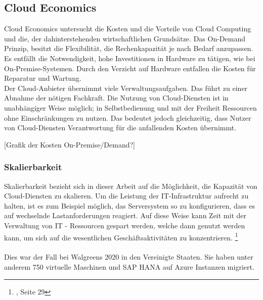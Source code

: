 \subsection{Cloud Economics}\label{subsec_UabsGrund3}
\begin{flushleft}
      Cloud Economics untersucht die Kosten und die Vorteile von Cloud Computing und die, der dahinterstehenden wirtschaftlichen Grundsätze. Das On-Demand Prinzip, besitzt die Flexibilität, die Rechenkapazität je nach Bedarf anzupassen.
      Es entfällt die Notwendigkeit, hohe Investitionen in Hardware zu tätigen, wie bei On-Premise-Systemen.
      Durch den Verzicht auf Hardware entfallen die Kosten für Reparatur und Wartung.
      \\
      Der Cloud-Anbieter übernimmt viele Verwaltungsaufgaben. Das führt zu einer Abnahme der nötigen Fachkraft\cite{IDC01}.
      Die Nutzung von Cloud-Diensten ist in unabhängiger Weise möglich; in Selbstbedienung und mit der Freiheit Ressourcen ohne Einschränkungen zu nutzen. Das bedeutet jedoch gleichzeitig, dass Nutzer von Cloud-Diensten Verantwortung für die anfallenden Kosten übernimmt.
\end{flushleft}

[Grafik der Kosten On-Premise/Demand?]
\subsubsection{Skalierbarkeit}
Skalierbarkeit bezieht sich in dieser Arbeit auf die Möglichkeit, die Kapazität von Cloud-Diensten zu skalieren. Um die Leistung der IT-Infrastruktur aufrecht zu halten, ist es zum Beispiel möglich, das Serversystem so zu konfigurieren, dass es auf wechselnde Lastanforderungen reagiert.
%
Auf diese Weise kann Zeit mit der Verwaltung von IT - Ressourcen gespart werden, welche dann genutzt werden kann, um sich auf die wesentlichen Geschäftsaktivitäten zu konzentrieren.
\footnote{\cite{AWS1}, Seite 29}
\\\\
Dies war der Fall bei Walgreens 2020 in den Vereinigte Staaten.
Sie haben unter anderem 750 virtuelle Maschinen und SAP HANA auf Azure Instanzen migriert.

